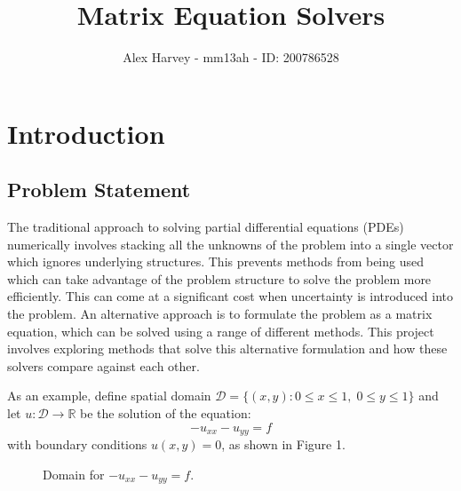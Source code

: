 \documentclass{article}
\title{Matrix Equation Solvers}
\author{Alex Harvey - mm13ah - ID: 200786528}
\date{}
\numberwithin{equation}{section}
\begin{document}
\maketitle

\newpage

\tableofcontents

\clearpage

\section{Introduction}
\subsection{Problem Statement}

The traditional approach to solving partial differential equations (PDEs) numerically involves stacking all the unknowns of the problem into a single vector which ignores underlying structures. This prevents methods from being used which can take advantage of the problem structure to solve the problem more efficiently. This can come at a significant cost when uncertainty is introduced into the problem. An alternative approach is to formulate the problem as a matrix equation, which can be solved using a range of different methods. This project involves exploring methods that solve this alternative formulation and how these solvers compare against each other. 

As an example, define spatial domain $\mathcal{D} = \{(x,y) : 0 \leq x \leq 1, \; 0 \leq y \leq 1 \}$ and let $u: \mathcal{D} \to \mathbb{R}$ be the solution of the equation:
	\begin{equation} 
	-u_{xx} - u_{yy} = f
	\end{equation}
with boundary conditions $u(x,y)=0$, as shown in Figure 1.

\begin{figure}[H]
\centering
\caption{Domain for $-u_{xx}-u_{yy}=f$.}
\end{figure}
\end{document}

